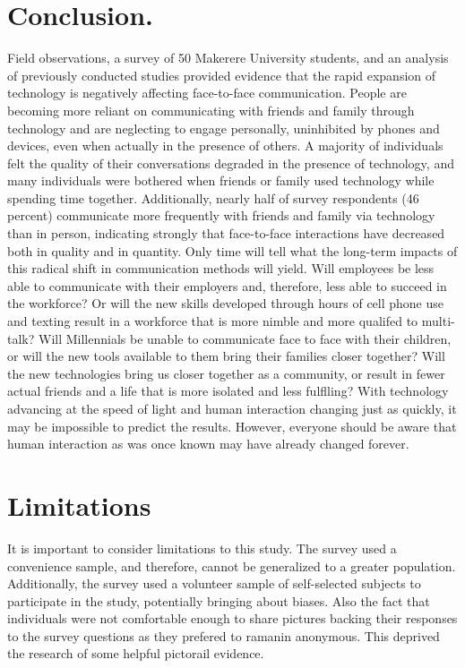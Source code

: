 \documentclass[11pt]{article} %
\begin{document}
\section{Conclusion.}
Field observations, a survey of 50 Makerere University students, and an analysis of previously conducted studies provided evidence that the rapid expansion of technology is negatively affecting face-to-face communication. 
People are becoming more reliant on communicating with friends and family through technology and are neglecting to engage personally, uninhibited by phones and devices, even when actually in the presence of others. A majority of individuals felt the quality of their conversations degraded in the presence of technology, and many individuals were bothered when friends or family used technology while spending time together. 
Additionally, nearly half of survey respondents (46 percent) communicate more frequently with friends and family via technology than in person, indicating strongly that face-to-face interactions have decreased both in quality and in quantity.
Only time will tell what the long-term impacts of this radical shift in communication methods will yield. Will employees be less able to communicate with their employers and, therefore, less able to succeed in the workforce? Or will the new skills developed through hours of cell phone use and texting result in a workforce that is more nimble and more qualifed to multi-talk? Will Millennials be unable to communicate face to face with their children, or will the new tools available to them bring their families closer together? Will the new technologies bring us closer together as a community, or result in fewer actual friends and a life that is more isolated and less fulflling? With technology advancing at the speed of light and human interaction changing just as quickly, it may be impossible to predict the results. However, everyone should be aware that human interaction as was once known may have already changed forever.

\section{Limitations }

It is important to consider limitations to this study. The survey used a convenience sample, and therefore, cannot be generalized to a greater population. Additionally, the survey used a volunteer sample of self-selected subjects to participate in the study, potentially bringing about biases.
\newline Also the fact that individuals were not comfortable enough to share pictures backing their responses to the survey questions as they prefered to ramanin anonymous. This deprived the research of some helpful pictorail evidence.
\end{document}
